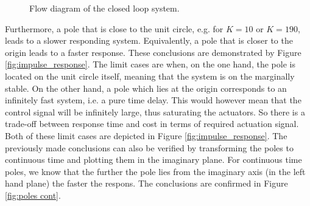\documentclass[a4paper,kul]{kulakarticle} %
\begin{document}
\begin{figure}[htp]
	\centering
	\caption{Flow diagram of the closed loop system. \cite{tikz}}
	\label{fig:flowdiagram}
\end{figure}
\newpage
\noindent Furthermore, a pole that is close to the unit circle, e.g. for $K = 10$ or $K = 190$, leads to a slower responding system. Equivalently, a pole that is closer to the origin leads to a faster response. These conclusions are demonstrated by Figure \ref{fig:impulse_response}. The limit cases are when, on the one hand, the pole is located on the unit circle itself, meaning that the system is on the marginally stable. On the other hand, a pole which lies at the origin corresponds to an infinitely fast system, i.e. a pure time delay. This would however mean that the control signal will be infinitely large, thus saturating the actuators. So there is a trade-off between response time and cost in terms of required actuation signal. Both of these limit cases are depicted in Figure \ref{fig:impulse_response}. The previously made conclusions can also be verified by transforming the poles to continuous time and plotting them in the imaginary plane. For continuous time poles, we know that the further the pole lies from the imaginary axis (in the left hand plane) the faster the respons. The conclusions are confirmed in Figure \ref{fig:poles cont}. 
\end{document}
